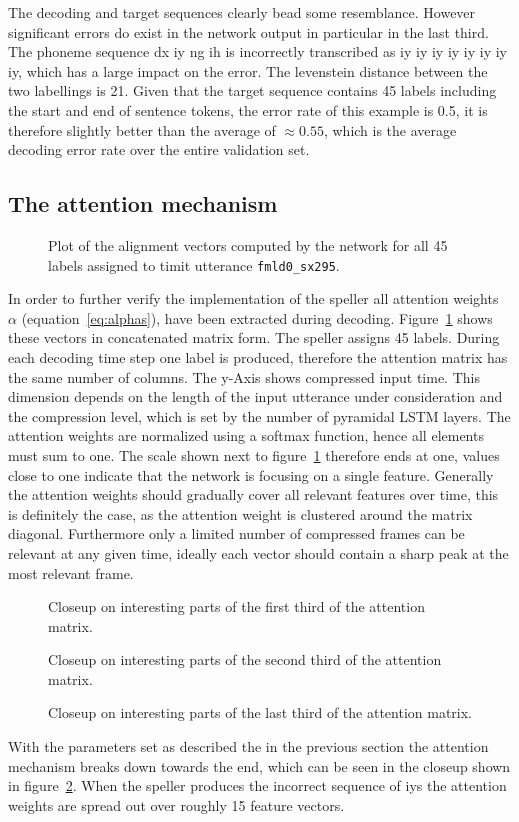 The decoding and target sequences clearly bead some resemblance. However significant errors do exist in the network output in particular in the last third. The phoneme sequence dx  iy  ng  ih is incorrectly transcribed as iy  iy  iy  iy  iy  iy  iy iy,
which has a large impact on the error. The levenstein distance between the two labellings is 21. Given that the target sequence contains 45 labels including the start and end of sentence tokens, the error rate of this example is 0.5, it is therefore slightly better than the average of $\approx 0.55$, which is the average decoding error rate over the entire validation set.

\subsection{The attention mechanism}
\begin{figure}
\centering

\caption{Plot of the alignment vectors computed by the network for all 45 labels assigned to timit utterance \texttt{fmld0\_sx295}.}
\label{fig:fullAttention}
\end{figure}
In order to further verify the implementation of the speller all attention weights $\alpha$ (equation~\ref{eq:alphas}), have been extracted during decoding. Figure~\ref{fig:fullAttention} shows these vectors in concatenated matrix form. The speller assigns 45 labels. During each decoding time step one label is produced, therefore the attention matrix has the same number of columns. The y-Axis shows compressed input time. This dimension depends on the length of the input utterance under consideration and the compression level, which is set by the number of pyramidal LSTM layers. The attention weights are normalized using a softmax function, hence all elements must sum to one. The scale shown next to figure~\ref{fig:fullAttention} therefore ends at one, values close to one indicate that the network is focusing on a single feature. Generally the attention weights should gradually cover all relevant features over time, this is definitely the case, as the attention weight is clustered around the matrix diagonal. 
Furthermore only a limited number of compressed frames can be relevant at any given time, ideally each vector should contain a sharp peak at the most relevant frame.     
\begin{figure}
\centering

\caption{Closeup on interesting parts of the first third of the attention matrix.}

\caption{Closeup on interesting parts of the second third of the attention matrix.}

\caption{Closeup on interesting parts of the last third of the attention matrix.}
\label{fig:attention3}
\end{figure}
With the parameters set as described the in the previous section the attention mechanism breaks down towards the end, which can be seen in the closeup shown in figure~\ref{fig:attention3}. When the speller produces the incorrect sequence of iys the attention weights are spread out over roughly 15 feature vectors. 


